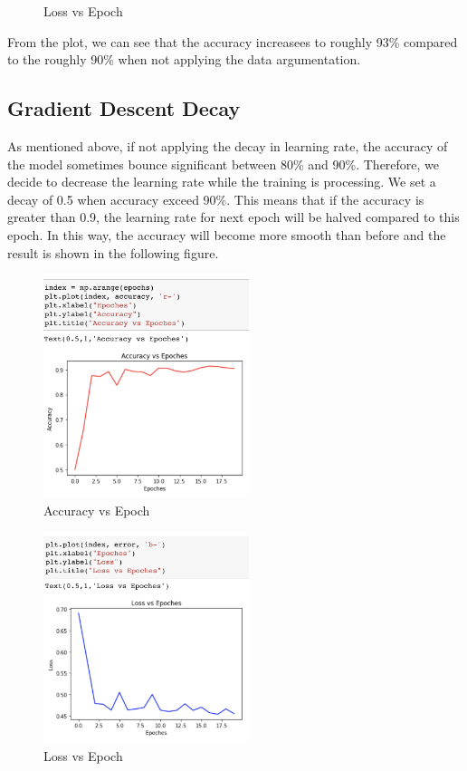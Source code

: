 \documentclass[12pt]{article}
\begin{document}
\begin{itemize}
\begin{figure}[!h]
\begin{center}
			\end{center}
			\caption{Loss vs Epoch}
		\end{figure}
		\newpage
		From the plot, we can see that the accuracy increasees to roughly 93\% compared to the roughly 90\% when not applying the data argumentation.
		\end{itemize}

	\subsection{Gradient Descent Decay}
	As mentioned above, if not applying the decay in learning rate, the accuracy of the model sometimes bounce significant between 80\% and 90\%. Therefore, we decide to decrease the learning rate while the training is processing. We set a decay of 0.5 when accuracy exceed 90\%. This means that if the accuracy is greater than 0.9, the learning rate for next epoch will be halved compared to this epoch. In this way, the accuracy will become more smooth than before and the result is shown in the following figure.
	\begin{figure}[ht]
		\begin{center}
			\includegraphics[width = 6cm]{decay_acc}
		\end{center}
		\caption{Accuracy vs Epoch}
	\end{figure}
	\begin{figure}[!h]
		\begin{center}
			\includegraphics[width = 6cm]{decay_loss}
		\end{center}
		\caption{Loss vs Epoch}
	\end{figure}
\end{document}
